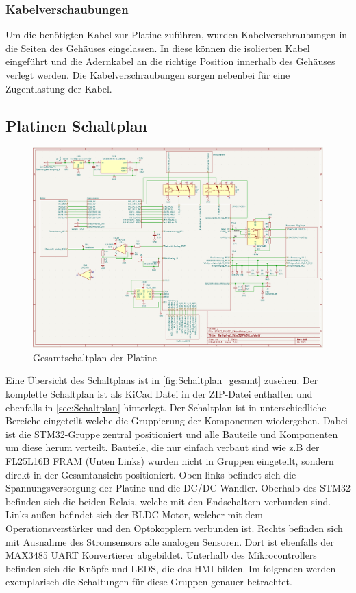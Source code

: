 \subsubsection{Kabelverschaubungen}
Um die benötigten Kabel zur Platine zuführen, wurden Kabelverschraubungen in die Seiten des Gehäuses eingelassen. In diese können die isolierten Kabel eingeführt und die Adernkabel an die richtige Position innerhalb des Gehäuses verlegt werden. Die Kabelverschraubungen sorgen nebenbei für eine Zugentlastung der Kabel.
\subsection{Platinen Schaltplan}
\begin{figure}[H]
	\centering
	\includegraphics[width=1.0\textwidth]{images/Hardware/Schaltplan_Gesamt.PNG}
	\caption{Gesamtschaltplan der Platine}
	\label{fig:Schaltplan_gesamt}
\end{figure}
Eine Übersicht des Schaltplans ist in \autoref{fig:Schaltplan_gesamt} zusehen. Der komplette Schaltplan ist als KiCad Datei in der ZIP-Datei enthalten und ebenfalls in \autoref{sec:Schaltplan} hinterlegt. Der Schaltplan ist in unterschiedliche Bereiche eingeteilt welche die Gruppierung der Komponenten wiedergeben. Dabei ist die STM32-Gruppe zentral positioniert und alle Bauteile und Komponenten um diese herum verteilt. Bauteile, die nur einfach verbaut sind wie z.B der FL25L16B \ac{FRAM} (Unten Links) wurden nicht in Gruppen eingeteilt, sondern direkt in der Gesamtansicht positioniert. Oben links befindet sich die Spannungsversorgung der Platine und die \ac{DC}/DC Wandler. Oberhalb des STM32 befinden sich die beiden Relais, welche mit den Endschaltern verbunden sind. Links außen befindet sich der \ac{BLDC} Motor, welcher mit dem Operationsverstärker und den Optokopplern verbunden ist. Rechts befinden sich mit Ausnahme des Stromsensors alle analogen Sensoren. Dort ist ebenfalls der MAX3485 \ac{UART} Konvertierer abgebildet. Unterhalb des Mikrocontrollers befinden sich die Knöpfe und LEDS, die das \ac{HMI} bilden. Im folgenden werden exemplarisch die Schaltungen für diese Gruppen genauer betrachtet.
